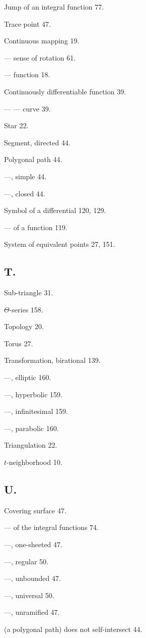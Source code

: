 \documentclass{article}
\begin{document}
Jump of an integral function 77.

Trace point 47.

Continuous mapping 19.

--- sense of rotation 61.

--- function 18.

Continuously differentiable function 39.

--- --- curve 39.

Star 22.

Segment, directed 44.

Polygonal path 44.

---, simple 44.

---, closed 44.

Symbol of a differential 120, 129.

--- of a function 119.

System of equivalent points 27, 151.

\subsection*{T.}

Sub-triangle 31.

$\Theta$-series 158.

Topology 20.

Torus 27.

Transformation, birational 139.

---, elliptic 160.

---, hyperbolic 159.

---, infinitesimal 159.

---, parabolic 160.

Triangulation 22.

$t$-neighborhood 10.

\subsection*{U.}

Covering surface 47.

--- of the integral functions 74.

---, one-sheeted 47.

---, regular 50.

---, unbounded 47.

---, universal 50.

---, unramified 47.

(a polygonal path) does not self-intersect 44.
\end{document}
